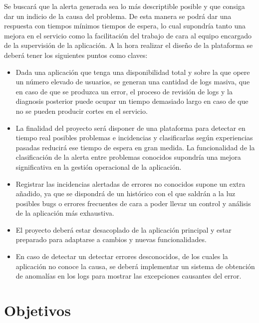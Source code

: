 Se buscará que la alerta generada sea lo más descriptible posible y que consiga dar un indicio de la causa del problema. De esta manera se podrá dar una respuesta con tiempos mínimos tiempos de espera, lo cual supondría tanto una mejora en el servicio como la facilitación del trabajo de cara al equipo encargado de la supervisión de la aplicación. A la hora realizar el diseño de la plataforma se deberá tener los siguientes puntos como claves: 

\begin{itemize}
\item Dada una aplicación que tenga una disponibilidad total y sobre la que opere un número elevado
de usuarios, se generan una cantidad de logs masiva, que en caso de que se produzca un error, el proceso de revisión de logs y la diagnosis posterior puede ocupar un tiempo
demasiado largo en caso de que no se pueden producir cortes en el servicio.

\item La finalidad del proyecto será disponer de una plataforma para detectar en tiempo real posibles problemas e incidencias y
clasificarlas según experiencias pasadas reducirá ese tiempo de espera en gran medida. La funcionalidad de la clasificación de la alerta entre problemas conocidos supondría una mejora significativa en la gestión operacional de la aplicación.

\item Registrar las incidencias alertadas de errores no conocidos supone un extra añadido, ya que se dispondrá de un histórico
con el que saldrán a la luz posibles bugs o errores frecuentes de cara a poder llevar un control
y análisis de la aplicación más exhaustiva.  

\item El proyecto deberá estar desacoplado de la aplicación principal y estar preparado para adaptarse a cambios y nuevas funcionalidades.

\item En caso de detectar un detectar errores desconocidos, de los cuales la aplicación no conoce la causa, se deberá implementar un sistema de obtención de anomalías en los logs para mostrar las excepciones causantes del error.

\end{itemize}




\section{Objetivos}

